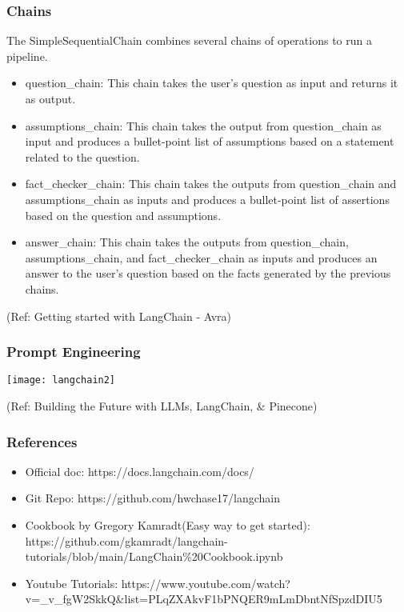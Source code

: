 \begin{frame}\frametitle{Chains}

The SimpleSequentialChain combines several chains of operations to run a pipeline. 

\begin{itemize}
\item question\_chain: This chain takes the user's question as input and returns it as output. 
\item assumptions\_chain: This chain takes the output from question\_chain as input and produces a bullet-point list of assumptions based on a statement related to the question. 
\item fact\_checker\_chain: This chain takes the outputs from question\_chain and assumptions\_chain as inputs and produces a bullet-point list of assertions based on the question and assumptions.
\item answer\_chain: This chain takes the outputs from question\_chain, assumptions\_chain, and fact\_checker\_chain as inputs and produces an answer to the user's question based on the facts generated by the previous chains.
\end{itemize}


{\tiny (Ref: Getting started with LangChain - Avra)}
\end{frame}


\begin{frame}\frametitle{Prompt Engineering}

\begin{center}
\texttt{[image: langchain2]}
\end{center}	  

{\tiny (Ref: Building the Future with LLMs, LangChain, \& Pinecone)}
\end{frame}

\begin{frame}\frametitle{References}


\begin{itemize}
\item Official doc: https://docs.langchain.com/docs/
\item Git Repo: https://github.com/hwchase17/langchain
\item Cookbook by Gregory Kamradt(Easy way to get started): https://github.com/gkamradt/langchain-tutorials/blob/main/LangChain\%20Cookbook.ipynb
\item Youtube Tutorials: https://www.youtube.com/watch?v=\_v\_fgW2SkkQ\&list=PLqZXAkvF1bPNQER9mLmDbntNfSpzdDIU5
\end{itemize}


\end{frame}